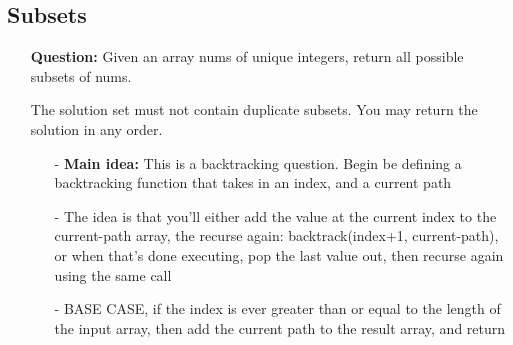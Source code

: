 \documentclass[12pt]{article}
\begin{document}
\subsection{Subsets}
\begin{enumerate}
  \item[] \textbf{Question:} Given an array nums of unique integers, return all possible subsets of nums.

The solution set must not contain duplicate subsets. You may return the solution in any order.

    \begin{enumerate}
      \item[-] \textbf{Main idea:} This is a backtracking question. Begin be defining a backtracking function that takes in an index, and a current path
      \item[-] The idea is that you'll either add the value at the current index to the current-path array, the recurse again: backtrack(index+1, current-path), or when that's done executing, pop the last value out, then recurse again using the same call
      \item[-] BASE CASE, if the index is ever greater than or equal to the length of the input array, then add the current path to the result array, and return

    \end{enumerate}
\end{enumerate}
\end{document}

